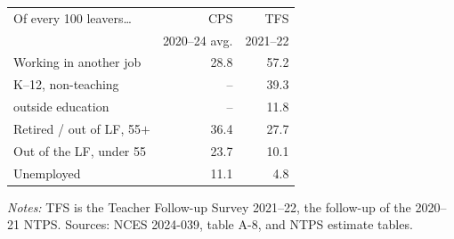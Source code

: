 \documentclass[11pt]{article}
\begin{document}
\begin{center}
\begin{threeparttable}
\begin{tabular}{lrr}
\toprule
Of every 100 leavers\ldots & CPS & TFS \\
 & {\footnotesize 2020--24 avg.} & {\footnotesize 2021--22} \\
\midrule
Working in another job        & 28.8 & 57.2 \\
\quad K--12, non-teaching     & --   & 39.3 \\
\quad outside education       & --   & 11.8 \\
Retired / out of LF, 55$+$    & 36.4 & 27.7 \\
Out of the LF, under 55       & 23.7 & 10.1 \\
Unemployed                    & 11.1 & 4.8  \\
\bottomrule
\end{tabular}
\begin{tablenotes}[flushleft]
\footnotesize
\item \emph{Notes:} TFS is the Teacher Follow-up Survey 2021--22, the
follow-up of the 2020--21 NTPS. Sources: NCES 2024-039, table A-8, and
NTPS estimate tables.
\end{tablenotes}
\end{threeparttable}
\end{center}
\end{document}
